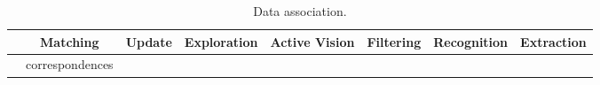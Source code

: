 \documentclass{article}
\begin{document}
			
	\begin{table}
		\centering
		\begin{tabular}{|c|c|c|c|c|c|c|c|}
			\hline
			 & Matching & Update & Exploration & Active Vision & Filtering & Recognition & Extraction \\
			\hline
			 & correspondences \\ 
			\hline
		\end{tabular}
		\caption{Data association.}
		\label{tab:assoc}
	\end{table}
	
\end{document}
